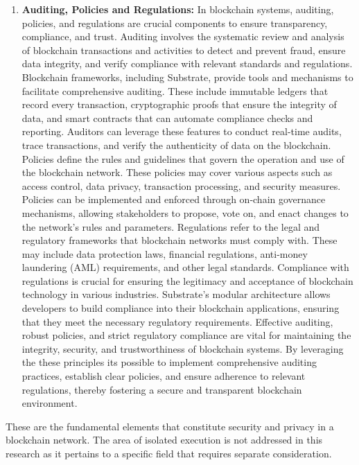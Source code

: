 \begin{enumerate}[label=\textbullet]
	\item\textbf{Auditing, Policies and Regulations:}\cite{hype_security}\cite{nist_pub_bloc_acc_ctrl}
    In blockchain systems, auditing, policies, and regulations are crucial components to ensure transparency, compliance, and trust. Auditing involves the systematic review and analysis of blockchain transactions and activities to detect and prevent fraud, ensure data integrity, and verify compliance with relevant standards and regulations.
	Blockchain frameworks, including Substrate, provide tools and mechanisms to facilitate comprehensive auditing. These include immutable ledgers that record every transaction, cryptographic proofs that ensure the integrity of data, and smart contracts that can automate compliance checks and reporting. Auditors can leverage these features to conduct real-time audits, trace transactions, and verify the authenticity of data on the blockchain.
	Policies define the rules and guidelines that govern the operation and use of the blockchain network. These policies may cover various aspects such as access control, data privacy, transaction processing, and security measures. Policies can be implemented and enforced through on-chain governance mechanisms, allowing stakeholders to propose, vote on, and enact changes to the network's rules and parameters.
	Regulations refer to the legal and regulatory frameworks that blockchain networks must comply with. These may include data protection laws, financial regulations, anti-money laundering (AML) requirements, and other legal standards. Compliance with regulations is crucial for ensuring the legitimacy and acceptance of blockchain technology in various industries. Substrate's modular architecture allows developers to build compliance into their blockchain applications, ensuring that they meet the necessary regulatory requirements.
	Effective auditing, robust policies, and strict regulatory compliance are vital for maintaining the integrity, security, and trustworthiness of blockchain systems. By leveraging the these principles its possible to implement comprehensive auditing practices, establish clear policies, and ensure adherence to relevant regulations, thereby fostering a secure and transparent blockchain environment.

\end{enumerate}

These are the fundamental elements that constitute security and privacy in a blockchain network. The area of isolated execution is not addressed in this research as it pertains to a specific field that requires separate consideration. 

